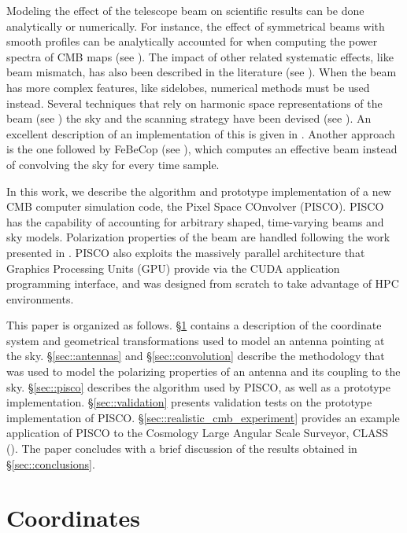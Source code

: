 \documentclass[a4paper,11pt]{article}
\begin{document}
Modeling the effect of the telescope beam on scientific results can be done analytically or numerically. For instance, the effect of symmetrical beams with smooth profiles can be analytically accounted for when computing the power spectra of CMB maps (see \cite{2003ApJS..148...39P}). The impact of other related systematic effects, like beam mismatch, has also been described in the literature (see \cite{PhysRevD.77.083003, 2007MNRAS.376.1767O, 2015JCAP...03..048D}). When the beam has more complex features, like sidelobes, numerical methods must be used instead. Several techniques that rely on harmonic space representations of the beam (see \cite{2010ApJS..190..267P}) the sky and the scanning strategy have been devised (see \cite{2001PhRvD..63l3002W,2000PhRvD..62l3002C}). An excellent description of an implementation of this is given in \cite{2018arXiv180905034D}. Another approach is the one followed by FeBeCop (see \cite{2011ApJS..193....5M}), which computes an effective beam instead of convolving the sky for every time sample. 

In this work, we describe the algorithm and prototype implementation of a new CMB computer simulation code, the Pixel Space COnvolver (PISCO). PISCO has the capability of accounting for arbitrary shaped, time-varying beams and sky models. Polarization properties of the beam are handled following the work presented in \cite{2007MNRAS.376.1767O}. PISCO also exploits the massively parallel architecture that Graphics Processing Units (GPU) provide via the CUDA application programming interface, and was designed from scratch to take advantage of HPC environments.

This paper is organized as follows. 
\S\ref{sec::coordinate-systems} contains a description of the coordinate system and geometrical transformations used to model an antenna pointing at the sky.
\S\ref{sec::antennas} and \S\ref{sec::convolution} describe the methodology that was used to model the polarizing properties of an antenna and its coupling to the sky.
\S\ref{sec::pisco} describes the algorithm used by PISCO, as well as a prototype implementation. 
\S\ref{sec::validation} presents validation tests on the prototype implementation of PISCO. 
\S\ref{sec::realistic_cmb_experiment} provides an example application of PISCO to the Cosmology Large Angular Scale Surveyor, CLASS (\cite{2016SPIE.9914E..1KH}). 
The paper concludes with a brief discussion of the results obtained in \S\ref{sec::conclusions}.

%
\section{Coordinates}
\label{sec::coordinate-systems}
\end{document}
